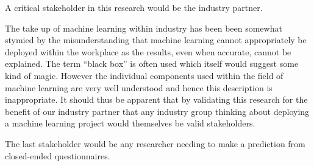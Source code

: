 A critical stakeholder in this research would be the industry partner.

The take up of machine learning within industry has been been somewhat stymied by the misunderstanding that machine learning cannot appropriately be deployed within the workplace as the results, even when accurate, cannot be explained. The term “black box” is often used which itself would suggest some kind of magic. However the individual components used within the field of machine learning are very well understood and hence this description is inappropriate. It should thus be apparent that by validating this research for the benefit of our industry partner that any industry group thinking about deploying a machine learning project would themselves be valid stakeholders. 

The last stakeholder would be any researcher needing to make a prediction from closed-ended questionnaires.  

